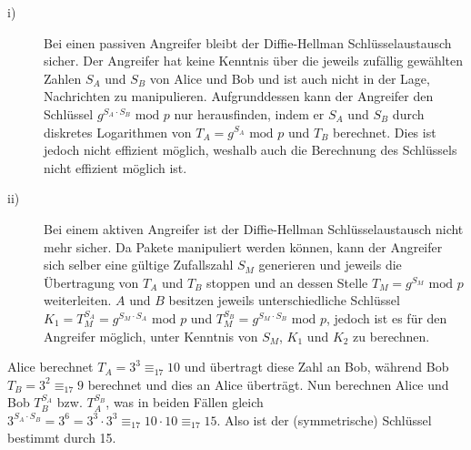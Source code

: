 \documentclass{../exercisesheet}
\begin{document}
\begin{exercise}{4}
\begin{subexercise}
\begin{description}
\item[i)] Bei einen passiven Angreifer bleibt der Diffie-Hellman Schlüsselaustausch sicher. Der Angreifer hat keine Kenntnis über die jeweils zufällig gewählten Zahlen $S_A$ und $S_B$
von Alice und Bob und ist auch nicht in der Lage, Nachrichten zu manipulieren. Aufgrunddessen kann der Angreifer den Schlüssel $g^{S_A \cdot S_B} \text{ mod } p$ nur herausfinden, 
indem er $S_A$ und $S_B$ durch diskretes Logarithmen von $T_A=g^{S_A} \text{ mod }p$ und $T_B$ berechnet. Dies ist jedoch nicht effizient möglich, weshalb auch die Berechnung
des Schlüssels nicht effizient möglich ist.

\item[ii)] Bei einem aktiven Angreifer ist der Diffie-Hellman Schlüsselaustausch nicht mehr sicher. Da Pakete manipuliert werden können, kann der Angreifer sich selber eine gültige Zufallszahl
$S_M$ generieren und jeweils die Übertragung von $T_A$ und $T_B$ stoppen und an dessen Stelle $T_M=g^{S_M} \text{ mod }p$ weiterleiten. $A$ und $B$ besitzen jeweils
unterschiedliche Schlüssel $K_1=T_M^{S_A}=g^{S_M \cdot S_A} \text{ mod }p$ und $T_M^{S_B}=g^{S_M \cdot S_B} \text{ mod }p$, jedoch ist es für den Angreifer möglich, unter Kenntnis
von $S_M$, $K_1$ und $K_2$ zu berechnen.
\end{description}
\end{subexercise}
\begin{subexercise}
Alice berechnet $T_A=3^3 \equiv_{17} 10$ und übertragt diese Zahl an Bob, während Bob $T_B=3^2 \equiv_{17} 9$ berechnet und dies an Alice überträgt.
Nun berechnen Alice und Bob $T_B^{S_A}$ bzw. $T_A^{S_B}$, was in beiden Fällen gleich $3^{S_A \cdot S_B} = 3^6 = 3^3 \cdot 3^3 \equiv_{17} 10 \cdot 10 \equiv_{17} 15$.
Also ist der (symmetrische) Schlüssel bestimmt durch 15.
\end{subexercise}
\end{exercise}
\end{document}
